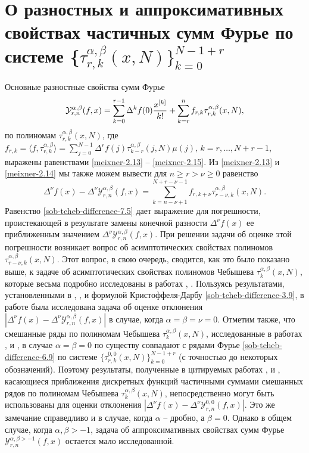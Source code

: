 \section{О разностных и аппроксимативных свойствах частичных сумм Фурье по системе
\{$ \tau_{r,k}^{\alpha,\beta}(x,N)\}_{k=0}^{N-1+r} $}
Основные разностные свойства  сумм Фурье
\begin{equation}\label{sob-tcheb-difference-7.1}
 \mathcal{Y}_{r,n}^{\alpha,\beta}(f,x)= \sum_{k=0}^{r-1}\Delta^kf(0){x^{[k]}\over k!} +\sum_{k=r}^{n}f_{r,k}\tau_{r,k}^{\alpha,\beta}(x,N),
  \end{equation}
по полиномам $\tau_{r,k}^{\alpha,\beta}(x,N)$, где
$f_{r,k}=
\langle f,\tau_{r,k}^{\alpha,\beta} \rangle=
\sum_{j=0}^{N-1}\Delta^rf(j)\tau_{k-r}^{\alpha,\beta}(j,N)\mu(j),\, k=r,\ldots, N+r-1$, выражены равенствами \eqref{meixner-2.13} -- \eqref{meixner-2.15}.
Из \eqref{meixner-2.13} и \eqref{meixner-2.14} мы также можем вывести для $n\ge r>\nu\ge0$ равенство
\begin{equation}\label{sob-tcheb-difference-7.5}
 \Delta^\nu f(x)-\Delta^\nu\mathcal{Y}_{r,n}^{\alpha,\beta}(f,x)= \sum_{k=n-\nu+1}^{N+r-\nu-1} f_{r,k+\nu} \tau_{r-\nu,k}^{\alpha,\beta}(x,N).
  \end{equation}
Равенство  \eqref{sob-tcheb-difference-7.5} дает выражение для погрешности, проистекающей в результате замены конечной разности  $\Delta^\nu f(x)$ ее приближенным значением $\Delta^\nu\mathcal{Y}_{r,n}^{\alpha,\beta}(f,x)$. При решении задачи об оценке этой погрешности возникает вопрос об асимптотических свойствах полиномов $\tau_{r-\nu,k}^{\alpha,\beta}(x,N)$. Этот вопрос, в свою очередь, сводится, как это было показано выше, к задаче об асимптотических свойствах полиномов Чебышева  $\tau_k^{\alpha,\beta}(x,N)$, которые весьма подробно исследованы в работах \cite{sob-tcheb-difference-Shar17}, \cite{sob-tcheb-difference-Shar18}. Пользуясь результатами, установленными в \cite{sob-tcheb-difference-Shar17}, \cite{sob-tcheb-difference-Shar18}, и формулой Кристоффеля-Дарбу \eqref{sob-tcheb-difference-3.9}, в работе \cite{sob-tcheb-difference-Shar5} была исследована задача об оценке отклонения
 $ |\Delta^\nu f(x)-\Delta^\nu\mathcal{Y}_{r,n}^{\alpha,\beta}(f,x)|$   в случае, когда $\alpha=\beta=\nu=0$. Отметим также, что смешанные ряды по полиномам Чебышева $\tau_k^{\alpha,\beta}(x,N)$, исследованные в работах \cite{sob-tcheb-difference-Shar9}, \cite{sob-tcheb-difference-Shar2} и \cite{sob-tcheb-difference-Shar11}, в случае $\alpha=\beta=0$ по существу совпадают с рядами Фурье \eqref{sob-tcheb-difference-6.9} по системе $\{ \tau_{r,k}^{0,0}(x,N)\}_{k=0}^{N-1+r} $ (с точностью до некоторых обозначений). Поэтому результаты, полученные в цитируемых работах \cite{sob-tcheb-difference-Shar9}, \cite{sob-tcheb-difference-Shar2} и \cite{sob-tcheb-difference-Shar11}, касающиеся  приближения дискретных функций частичными суммами смешанных рядов по полиномам Чебышева $\tau_k^{\alpha,\beta}(x,N)$,  непосредственно могут быть использованы для оценки отклонения
 $ |\Delta^\nu f(x)-\Delta^\nu\mathcal{Y}_{r,n}^{0,0}(f,x)|$. Это же замечание справедливо и в случае, когда $\alpha$ -- дробно, а $\beta=0$. Однако в общем случае, когда $\alpha,\beta>-1$, задача об аппроксимативных свойствах сумм Фурье
 $\mathcal{Y}_{r,n}^{\alpha,\beta>-1}(f,x)$ остается мало исследованной.

